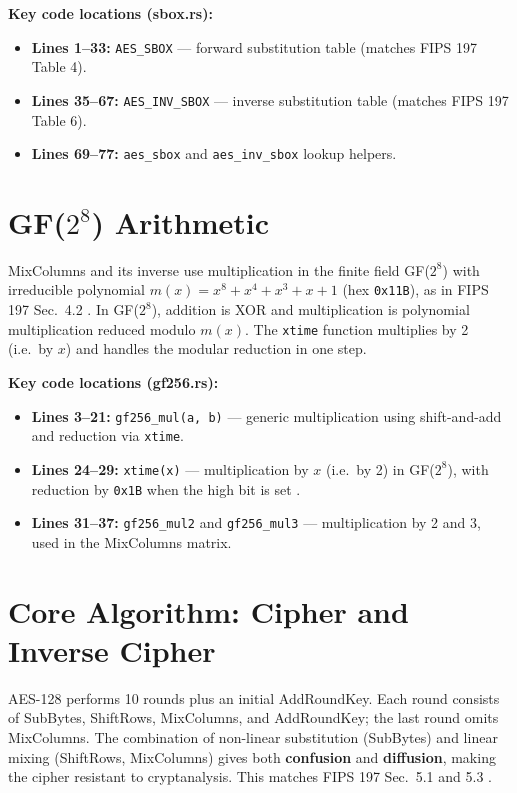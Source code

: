 \documentclass[11pt]{article}
\begin{document}
\textbf{Key code locations (sbox.rs):}
\begin{itemize}
    \item \textbf{Lines 1--33:} \texttt{AES\_SBOX} --- forward substitution table (matches FIPS 197 Table 4).
    \item \textbf{Lines 35--67:} \texttt{AES\_INV\_SBOX} --- inverse substitution table (matches FIPS 197 Table 6).
    \item \textbf{Lines 69--77:} \texttt{aes\_sbox} and \texttt{aes\_inv\_sbox} lookup helpers.
\end{itemize}

\section{GF($2^8$) Arithmetic}

MixColumns and its inverse use multiplication in the finite field GF($2^8$) with irreducible polynomial $m(x) = x^8 + x^4 + x^3 + x + 1$ (hex \texttt{0x11B}), as in FIPS 197 Sec.\ 4.2 \cite{NIST2001}. In GF($2^8$), addition is XOR and multiplication is polynomial multiplication reduced modulo $m(x)$. The \texttt{xtime} function multiplies by 2 (i.e.\ by $x$) and handles the modular reduction in one step.

\textbf{Key code locations (gf256.rs):}
\begin{itemize}
    \item \textbf{Lines 3--21:} \texttt{gf256\_mul(a, b)} --- generic multiplication using shift-and-add and reduction via \texttt{xtime}.
    \item \textbf{Lines 24--29:} \texttt{xtime(x)} --- multiplication by $x$ (i.e.\ by 2) in GF($2^8$), with reduction by \texttt{0x1B} when the high bit is set \cite{NIST2001}.
    \item \textbf{Lines 31--37:} \texttt{gf256\_mul2} and \texttt{gf256\_mul3} --- multiplication by 2 and 3, used in the MixColumns matrix.
\end{itemize}

\section{Core Algorithm: Cipher and Inverse Cipher}

AES-128 performs 10 rounds plus an initial AddRoundKey. Each round consists of SubBytes, ShiftRows, MixColumns, and AddRoundKey; the last round omits MixColumns. The combination of non-linear substitution (SubBytes) and linear mixing (ShiftRows, MixColumns) gives both \textbf{confusion} and \textbf{diffusion}, making the cipher resistant to cryptanalysis. This matches FIPS 197 Sec.\ 5.1 and 5.3 \cite{NIST2001}.
\end{document}
